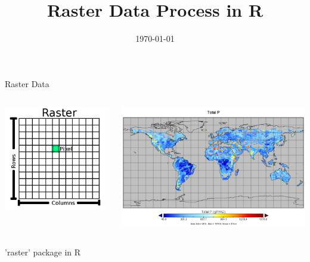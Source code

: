 \documentclass{beamer}
\title{Raster Data Process in R}
\date{\today}
\begin{document}
\maketitle

\begin{frame}{Raster Data}
	
\begin{columns}
\begin{column}{0.5\textwidth}
\includegraphics[width=\textwidth]{figures/raster_dataset.png}
\end{column}

\begin{column}{0.5\textwidth}
    \begin{center}
     \includegraphics[width=\textwidth]{figures/global_P_total.png}      
     \end{center}
\end{column}
\end{columns}
	
\end{frame}

\begin{frame}{'raster' package in R}
	
\end{frame}
\end{document}
